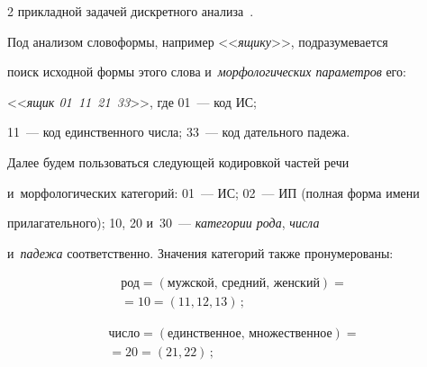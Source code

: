 \begin{multicols}{2}
при\-клад\-ной задачей дискретного анализа~\cite{2-mir}. 


     


     Под анализом словоформы, например <<\textit{ящику}>>, под\-ра\-зу\-ме\-ва\-ет\-ся 


поиск исходной формы этого слова и~\textit{морфологических параметров} его: 


<<\textit{ящик 01~11~21~33}>>, где 01~--- код ИС; 


11~--- код единственного чис\-ла; 33~--- код дательного падежа.


     


     Далее будем пользоваться следующей кодировкой час\-тей речи 


и~морфологических категорий: 01~--- ИС; 02~--- ИП (полная форма имени 


прилагательного); 10, 20 и~30~--- \textit{категории рода}, \textit{числа} 


и~\textit{падежа} соответственно. Значения категорий так\-же пронумерованы:





\vspace*{-3pt}





\noindent


     \begin{multline*}


\mbox{род} = (\mbox{мужской,\ средний,\ женский}) ={}\!\\


    {}= 10 = 


(11, 12, 13)\,; 


\end{multline*}





\vspace*{-13pt}





\noindent


\begin{multline*}


     \mbox{число} = (\mbox{единственное,\ множественное}) = {}\\


     {}=20=  (21, 22)\,; 


    \end{multline*}



\end{multicols}
